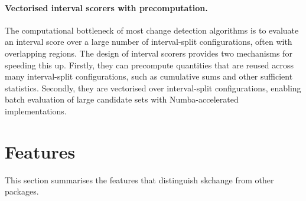 \documentclass[twoside,11pt]{article}
\begin{document}
\paragraph{Vectorised interval scorers with precomputation.}
The computational bottleneck of most change detection algorithms is to evaluate an interval score over a large number of interval-split configurations, often with overlapping regions.
The design of interval scorers provides two mechanisms for speeding this up.
Firstly, they can precompute quantities that are reused across many interval-split configurations, such as cumulative sums and other sufficient statistics.
Secondly, they are vectorised over interval-split configurations, enabling batch evaluation of large candidate sets with Numba-accelerated implementations.





\section{Features}
\label{sec:features}
This section summarises the features that distinguish skchange from other packages.
\end{document}
